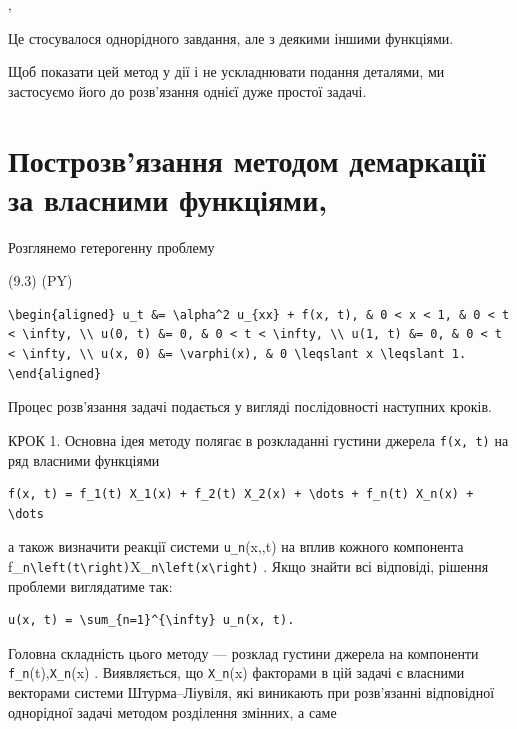 \documentclass[
  ukrainian,
]{article}
\begin{document}
,

Це стосувалося однорідного завдання, але з деякими іншими функціями.

Щоб показати цей метод у дії і не ускладнювати подання деталями, ми
застосуємо його до розв'язання однієї дуже простої задачі.

\section{Построзв'язання методом демаркації за власними
функціями,}\label{ux43fux43eux441ux442ux440ux43eux437ux432ux44fux437ux430ux43dux43dux44f-ux43cux435ux442ux43eux434ux43eux43c-ux434ux435ux43cux430ux440ux43aux430ux446ux456ux457-ux437ux430-ux432ux43bux430ux441ux43dux438ux43cux438-ux444ux443ux43dux43aux446ux456ux44fux43cux438}

Розглянемо гетерогенну проблему

(9.3) (PY)

\begin{verbatim}
\begin{aligned} u_t &= \alpha^2 u_{xx} + f(x, t), & 0 < x < 1, & 0 < t < \infty, \\ u(0, t) &= 0, & 0 < t < \infty, \\ u(1, t) &= 0, & 0 < t < \infty, \\ u(x, 0) &= \varphi(x), & 0 \leqslant x \leqslant 1. \end{aligned}
\end{verbatim}

Процес розв'язання задачі подається у вигляді послідовності наступних
кроків.

КРОК 1. Основна ідея методу полягає в розкладанні густини джерела
\texttt{f(x,\ t)} на ряд власними функціями

\begin{verbatim}
f(x, t) = f_1(t) X_1(x) + f_2(t) X_2(x) + \dots + f_n(t) X_n(x) + \dots
\end{verbatim}

а також визначити реакції системи \texttt{u\_n}\left(x,,t\right) на
вплив кожного компонента
f\_\texttt{n\textbackslash{}left(t\textbackslash{}right)}X\_\texttt{n\textbackslash{}left(x\textbackslash{}right)}
. Якщо знайти всі відповіді, рішення проблеми виглядатиме так:

\begin{verbatim}
u(x, t) = \sum_{n=1}^{\infty} u_n(x, t).
\end{verbatim}

Головна складність цього методу --- розклад густини джерела на
компоненти \texttt{f\_n}(t),\texttt{X\_n}(x) . Виявляється, що
\texttt{X\_n}(x) факторами в цій задачі є власними векторами системи
Штурма--Ліувіля, які виникають при розв'язанні відповідної однорідної
задачі методом розділення змінних, а саме
\end{document}
